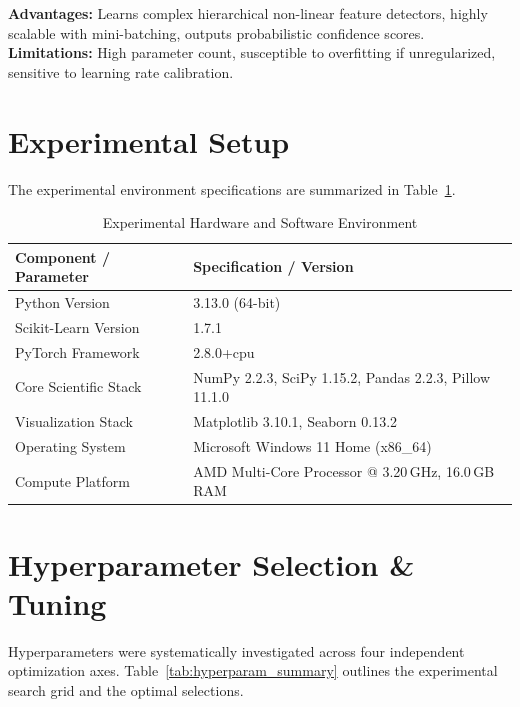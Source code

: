 \documentclass[12pt,a4paper]{article}
\begin{document}
\textbf{Advantages:} Learns complex hierarchical non-linear feature detectors, highly scalable with mini-batching, outputs probabilistic confidence scores. \\
\textbf{Limitations:} High parameter count, susceptible to overfitting if unregularized, sensitive to learning rate calibration.

\section{Experimental Setup}
The experimental environment specifications are summarized in Table~\ref{tab:setup}.

\begin{table}[H]
\centering
\caption{Experimental Hardware and Software Environment}
\label{tab:setup}
\begin{tabular}{ll}
\toprule
\textbf{Component / Parameter} & \textbf{Specification / Version} \\
\midrule
Python Version & 3.13.0 (64-bit) \\
Scikit-Learn Version & 1.7.1 \\
PyTorch Framework & 2.8.0+cpu \\
Core Scientific Stack & NumPy 2.2.3, SciPy 1.15.2, Pandas 2.2.3, Pillow 11.1.0 \\
Visualization Stack & Matplotlib 3.10.1, Seaborn 0.13.2 \\
Operating System & Microsoft Windows 11 Home (x86\_64) \\
Compute Platform & AMD Multi-Core Processor @ 3.20\,GHz, 16.0\,GB RAM \\
\bottomrule
\end{tabular}
\end{table}

\section{Hyperparameter Selection \& Tuning}
Hyperparameters were systematically investigated across four independent optimization axes. Table~\ref{tab:hyperparam_summary} outlines the experimental search grid and the optimal selections.
\end{document}
